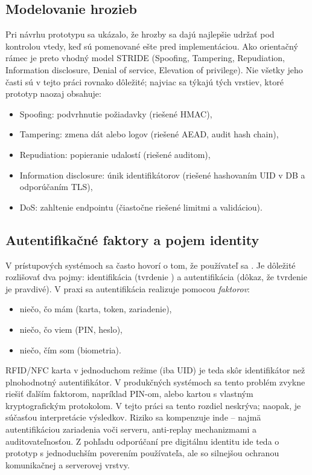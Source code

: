 \documentclass[journal,a4paper,onecolumn]{IEEEtran}
\begin{document}
\subsection{Modelovanie hrozieb}

Pri návrhu prototypu sa ukázalo, že hrozby sa dajú najlepšie udržať pod kontrolou vtedy, keď sú pomenované ešte pred implementáciou. Ako orientačný rámec je preto vhodný model STRIDE (Spoofing, Tampering, Repudiation, Information disclosure, Denial of service, Elevation of privilege). Nie všetky jeho časti sú v tejto práci rovnako dôležité; najviac sa týkajú tých vrstiev, ktoré prototyp naozaj obsahuje:

\begin{itemize}[leftmargin=*,itemsep=2pt]
  \item Spoofing: podvrhnutie požiadavky (riešené HMAC),
  \item Tampering: zmena dát alebo logov (riešené AEAD, audit hash chain),
  \item Repudiation: popieranie udalostí (riešené auditom),
  \item Information disclosure: únik identifikátorov (riešené hashovaním UID v DB a odporúčaním TLS),
  \item DoS: zahltenie endpointu (čiastočne riešené limitmi a validáciou).
\end{itemize}



\subsection{Autentifikačné faktory a pojem identity}

V prístupových systémoch sa často hovorí o tom, že používateľ sa . Je dôležité rozlišovať dva pojmy: identifikácia (tvrdenie ) a autentifikácia (dôkaz, že tvrdenie je pravdivé). V praxi sa autentifikácia realizuje pomocou \emph{faktorov}:

\begin{itemize}[leftmargin=*,itemsep=2pt]
  \item niečo, čo mám (karta, token, zariadenie),
  \item niečo, čo viem (PIN, heslo),
  \item niečo, čím som (biometria).
\end{itemize}

RFID/NFC karta v jednoduchom režime (iba UID) je teda skôr identifikátor než plnohodnotný autentifikátor. V produkčných systémoch sa tento problém zvykne riešiť ďalším faktorom, napríklad PIN-om, alebo kartou s vlastným kryptografickým protokolom. V tejto práci sa tento rozdiel neskrýva; naopak, je súčasťou interpretácie výsledkov. Riziko sa kompenzuje inde -- najmä autentifikáciou zariadenia voči serveru, anti-replay mechanizmami a auditovateľnosťou. Z pohľadu odporúčaní pre digitálnu identitu ide teda o prototyp s jednoduchším poverením používateľa, ale so silnejšou ochranou komunikačnej a serverovej vrstvy.\cite{NIST80063B4,FIPS2013}
\end{document}

